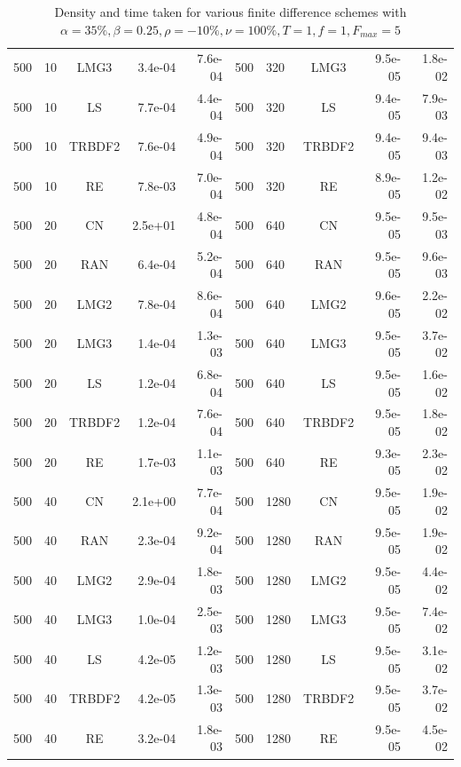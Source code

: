 \documentclass[]{rAMF2e}
\begin{document}
\begin{table}[h]
\begin{center}
\begin{tiny}
\begin{tabular}{|l|l|c|r|r||l|l|c|r|r|}
500 & 10 & LMG3 & 3.4e-04 & 7.6e-04&      500 & 320 & LMG3 & 9.5e-05 & 1.8e-02\\
500 & 10 & LS & 7.7e-04 & 4.4e-04&        500 & 320 & LS & 9.4e-05 & 7.9e-03\\
500 & 10 & TRBDF2 & 7.6e-04 & 4.9e-04&    500 & 320 & TRBDF2 & 9.4e-05 & 9.4e-03\\
500 & 10 & RE & 7.8e-03 & 7.0e-04&        500 & 320 & RE & 8.9e-05 & 1.2e-02\\
500 & 20 & CN & 2.5e+01 & 4.8e-04&        500 & 640 & CN & 9.5e-05 & 9.5e-03\\
500 & 20 & RAN & 6.4e-04 & 5.2e-04&       500 & 640 & RAN & 9.5e-05 & 9.6e-03\\
500 & 20 & LMG2 & 7.8e-04 & 8.6e-04&      500 & 640 & LMG2 & 9.6e-05 & 2.2e-02\\
500 & 20 & LMG3 & 1.4e-04 & 1.3e-03&      500 & 640 & LMG3 & 9.5e-05 & 3.7e-02\\
500 & 20 & LS & 1.2e-04 & 6.8e-04&        500 & 640 & LS & 9.5e-05 & 1.6e-02\\
500 & 20 & TRBDF2 & 1.2e-04 & 7.6e-04&    500 & 640 & TRBDF2 & 9.5e-05 & 1.8e-02\\
500 & 20 & RE & 1.7e-03 & 1.1e-03&        500 & 640 & RE & 9.3e-05 & 2.3e-02\\
500 & 40 & CN & 2.1e+00 & 7.7e-04&        500 & 1280 & CN & 9.5e-05 & 1.9e-02\\
500 & 40 & RAN & 2.3e-04 & 9.2e-04&       500 & 1280 & RAN & 9.5e-05 & 1.9e-02\\
500 & 40 & LMG2 & 2.9e-04 & 1.8e-03&      500 & 1280 & LMG2 & 9.5e-05 & 4.4e-02\\
500 & 40 & LMG3 & 1.0e-04 & 2.5e-03&      500 & 1280 & LMG3 & 9.5e-05 & 7.4e-02\\
500 & 40 & LS & 4.2e-05 & 1.2e-03&        500 & 1280 & LS & 9.5e-05 & 3.1e-02\\
500 & 40 & TRBDF2 & 4.2e-05 & 1.3e-03&    500 & 1280 & TRBDF2 & 9.5e-05 & 3.7e-02\\
500 & 40 & RE & 3.2e-04 & 1.8e-03&        500 & 1280 & RE & 9.5e-05 & 4.5e-02\\
\hline
\end{tabular}
\end{tiny}
\caption{Density and time taken for various finite difference schemes with $\alpha=35\%, \beta=0.25, \rho=-10\%, \nu=100\%, T=1, f=1, F_{max}=5$}
\end{center}
\end{table} 
\end{document}
